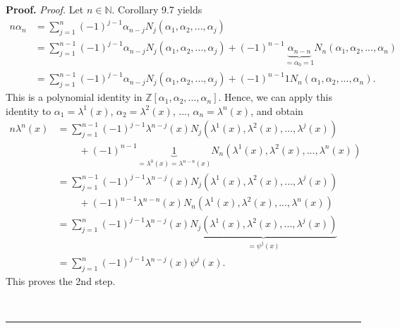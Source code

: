 \documentclass[numbers=enddot,12pt,final,onecolumn,notitlepage]{scrartcl}%
\newenvironment{proof}[1][Proof]{\noindent\textbf{#1.} }{\ \rule{0.5em}{0.5em}}
\begin{document}
\begin{proof}
\textit{Proof.} Let $n\in\mathbb{N}$. Corollary 9.7 yields%
\begin{align*}
n\alpha_{n}  &  =\sum\limits_{j=1}^{n}\left(  -1\right)  ^{j-1}\alpha
_{n-j}N_{j}\left(  \alpha_{1},\alpha_{2},...,\alpha_{j}\right) \\
&  =\sum\limits_{j=1}^{n-1}\left(  -1\right)  ^{j-1}\alpha_{n-j}N_{j}\left(
\alpha_{1},\alpha_{2},...,\alpha_{j}\right)  +\left(  -1\right)
^{n-1}\underbrace{\alpha_{n-n}}_{=\alpha_{0}=1}N_{n}\left(  \alpha_{1}%
,\alpha_{2},...,\alpha_{n}\right) \\
&  =\sum\limits_{j=1}^{n-1}\left(  -1\right)  ^{j-1}\alpha_{n-j}N_{j}\left(
\alpha_{1},\alpha_{2},...,\alpha_{j}\right)  +\left(  -1\right)  ^{n-1}%
1N_{n}\left(  \alpha_{1},\alpha_{2},...,\alpha_{n}\right)  .
\end{align*}
This is a polynomial identity in $\mathbb{Z}\left[  \alpha_{1},\alpha
_{2},...,\alpha_{n}\right]  $. Hence, we can apply this identity to
$\alpha_{1}=\lambda^{1}\left(  x\right)  $, $\alpha_{2}=\lambda^{2}\left(
x\right)  $, $...$, $\alpha_{n}=\lambda^{n}\left(  x\right)  $, and obtain%
\begin{align*}
n\lambda^{n}\left(  x\right)   &  =\sum_{j=1}^{n-1}\left(  -1\right)
^{j-1}\lambda^{n-j}\left(  x\right)  N_{j}\left(  \lambda^{1}\left(  x\right)
,\lambda^{2}\left(  x\right)  ,...,\lambda^{j}\left(  x\right)  \right) \\
&  \ \ \ \ \ \ \ \ \ \ +\left(  -1\right)  ^{n-1}\underbrace{1}_{=\lambda
^{0}\left(  x\right)  =\lambda^{n-n}\left(  x\right)  }N_{n}\left(
\lambda^{1}\left(  x\right)  ,\lambda^{2}\left(  x\right)  ,...,\lambda
^{n}\left(  x\right)  \right) \\
&  =\sum_{j=1}^{n-1}\left(  -1\right)  ^{j-1}\lambda^{n-j}\left(  x\right)
N_{j}\left(  \lambda^{1}\left(  x\right)  ,\lambda^{2}\left(  x\right)
,...,\lambda^{j}\left(  x\right)  \right) \\
&  \ \ \ \ \ \ \ \ \ \ +\left(  -1\right)  ^{n-1}\lambda^{n-n}\left(
x\right)  N_{n}\left(  \lambda^{1}\left(  x\right)  ,\lambda^{2}\left(
x\right)  ,...,\lambda^{n}\left(  x\right)  \right) \\
&  =\sum_{j=1}^{n}\left(  -1\right)  ^{j-1}\lambda^{n-j}\left(  x\right)
\underbrace{N_{j}\left(  \lambda^{1}\left(  x\right)  ,\lambda^{2}\left(
x\right)  ,...,\lambda^{j}\left(  x\right)  \right)  }_{=\psi^{j}\left(
x\right)  }\\
&  =\sum_{j=1}^{n}\left(  -1\right)  ^{j-1}\lambda^{n-j}\left(  x\right)
\psi^{j}\left(  x\right)  .
\end{align*}
This proves the 2nd step.


\end{proof}
\end{document}

